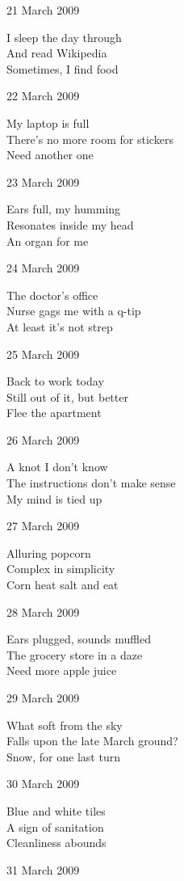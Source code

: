 \documentclass[12pt]{article}
\begin{document}
21 March 2009

I sleep the day through \\
And read Wikipedia \\
Sometimes, I find food

22 March 2009

My laptop is full \\
There's no more room for stickers \\
Need another one

23 March 2009

Ears full, my humming \\
Resonates inside my head \\
An organ for me

24 March 2009

The doctor's office \\
Nurse gags me with a q-tip \\
At least it's not strep

25 March 2009

Back to work today \\
Still out of it, but better \\
Flee the apartment

26 March 2009

A knot I don't know \\
The instructions don't make sense \\
My mind is tied up

\newpage

27 March 2009

Alluring popcorn \\
Complex in simplicity \\
Corn heat salt and eat

28 March 2009 

Ears plugged, sounds muffled \\
The grocery store in a daze \\
Need more apple juice

29 March 2009

What soft from the sky \\
Falls upon the late March ground? \\
Snow, for one last turn

30 March 2009

Blue and white tiles \\
A sign of sanitation \\
Cleanliness abounds

31 March 2009
\end{document}
